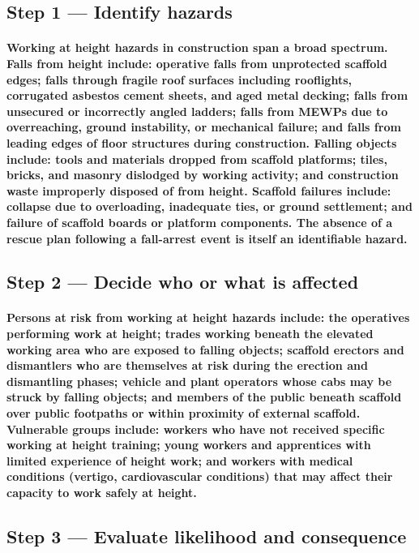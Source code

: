 \subsection{Step 1 --- Identify hazards}
\paragraph{Working at height hazards in construction span a broad spectrum. Falls from height include: operative falls from unprotected scaffold edges; falls through fragile roof surfaces including rooflights, corrugated asbestos cement sheets, and aged metal decking; falls from unsecured or incorrectly angled ladders; falls from MEWPs due to overreaching, ground instability, or mechanical failure; and falls from leading edges of floor structures during construction. Falling objects include: tools and materials dropped from scaffold platforms; tiles, bricks, and masonry dislodged by working activity; and construction waste improperly disposed of from height. Scaffold failures include: collapse due to overloading, inadequate ties, or ground settlement; and failure of scaffold boards or platform components. The absence of a rescue plan following a fall-arrest event is itself an identifiable hazard.}

\subsection{Step 2 --- Decide who or what is affected}
\paragraph{Persons at risk from working at height hazards include: the operatives performing work at height; trades working beneath the elevated working area who are exposed to falling objects; scaffold erectors and dismantlers who are themselves at risk during the erection and dismantling phases; vehicle and plant operators whose cabs may be struck by falling objects; and members of the public beneath scaffold over public footpaths or within proximity of external scaffold. Vulnerable groups include: workers who have not received specific working at height training; young workers and apprentices with limited experience of height work; and workers with medical conditions (vertigo, cardiovascular conditions) that may affect their capacity to work safely at height.}

\subsection{Step 3 --- Evaluate likelihood and consequence}
